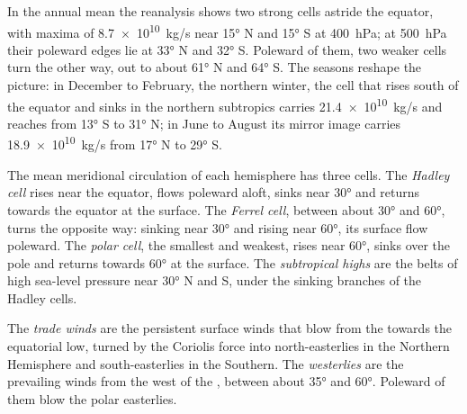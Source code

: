 In the annual mean the reanalysis shows two strong cells astride the equator, with
maxima of \qty{8.7e10}{kg/s} near \ang{15} N and \ang{15} S at \qty{400}{hPa}; at
\qty{500}{hPa} their poleward edges lie at \ang{33} N and \ang{32} S. Poleward of
them, two weaker cells turn the other way, out to about \ang{61} N and \ang{64} S.
The seasons reshape the picture: in December to February, the northern winter, the
cell that rises south of the equator and sinks in the northern subtropics carries
\qty{21.4e10}{kg/s} and reaches from \ang{13} S to \ang{31} N; in June to August
its mirror image carries \qty{18.9e10}{kg/s} from \ang{17} N to \ang{29} S.

\begin{definition}\label{def:b1:atmospheric-circulation:cells}
The mean meridional circulation of each hemisphere has three cells. The \emph{Hadley
cell} rises near the equator, flows poleward aloft, sinks near
\ang{30} and returns towards the equator at the surface. The \emph{Ferrel
cell}, between about \ang{30} and \ang{60}, turns the opposite way:
sinking near \ang{30} and rising near \ang{60}, its surface flow poleward. The
\emph{polar cell}, the smallest and weakest, rises near \ang{60},
sinks over the pole and returns towards \ang{60} at the surface. The
\emph{subtropical highs} are the belts of high sea-level
pressure near \ang{30} N and S, under the sinking branches of the Hadley cells.
\end{definition}

\begin{definition}\label{def:b1:atmospheric-circulation:winds}
The \emph{trade winds} are the persistent surface winds that blow
from the  towards the equatorial low, turned by the Coriolis force
into north-easterlies in the Northern Hemisphere and south-easterlies in the
Southern. The \emph{westerlies} are the prevailing winds from the
west of the , between about \ang{35} and \ang{60}. Poleward of them blow
the polar easterlies.
\end{definition}

